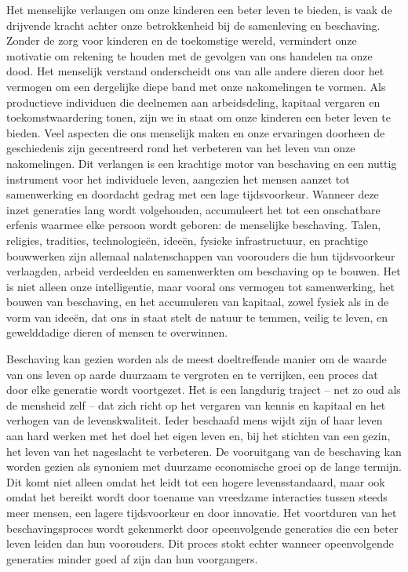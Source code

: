 \documentclass[
  a5paper,
  smalldemyvopaper,11pt,twoside,onecolumn,openright,extrafontsizes,
hidelinks]{memoir}
\begin{document}
Het menselijke verlangen om onze kinderen een beter leven te bieden, is
vaak de drijvende kracht achter onze betrokkenheid bij de samenleving en
beschaving. Zonder de zorg voor kinderen en de toekomstige wereld,
vermindert onze motivatie om rekening te houden met de gevolgen van ons
handelen na onze dood. Het menselijk verstand onderscheidt ons van alle
andere dieren door het vermogen om een dergelijke diepe band met onze
nakomelingen te vormen. Als productieve individuen die deelnemen aan
arbeidsdeling, kapitaal vergaren en toekomstwaardering tonen, zijn we in
staat om onze kinderen een beter leven te bieden. Veel aspecten die ons
menselijk maken en onze ervaringen doorheen de geschiedenis zijn
gecentreerd rond het verbeteren van het leven van onze nakomelingen. Dit
verlangen is een krachtige motor van beschaving en een nuttig instrument
voor het individuele leven, aangezien het mensen aanzet tot samenwerking
en doordacht gedrag met een lage tijdsvoorkeur. Wanneer deze inzet
generaties lang wordt volgehouden, accumuleert het tot een onschatbare
erfenis waarmee elke persoon wordt geboren: de menselijke beschaving.
Talen, religies, tradities, technologieën, ideeën, fysieke
infrastructuur, en prachtige bouwwerken zijn allemaal nalatenschappen
van voorouders die hun tijdsvoorkeur verlaagden, arbeid verdeelden en
samenwerkten om beschaving op te bouwen. Het is niet alleen onze
intelligentie, maar vooral ons vermogen tot samenwerking, het bouwen van
beschaving, en het accumuleren van kapitaal, zowel fysiek als in de vorm
van ideeën, dat ons in staat stelt de natuur te temmen, veilig te leven,
en gewelddadige dieren of mensen te overwinnen.

Beschaving kan gezien worden als de meest doeltreffende manier om de
waarde van ons leven op aarde duurzaam te vergroten en te verrijken, een
proces dat door elke generatie wordt voortgezet. Het is een langdurig
traject -- net zo oud als de mensheid zelf -- dat zich richt op het
vergaren van kennis en kapitaal en het verhogen van de levenskwaliteit.
Ieder beschaafd mens wijdt zijn of haar leven aan hard werken met het
doel het eigen leven en, bij het stichten van een gezin, het leven van
het nageslacht te verbeteren. De vooruitgang van de beschaving kan
worden gezien als synoniem met duurzame economische groei op de lange
termijn. Dit komt niet alleen omdat het leidt tot een hogere
levensstandaard, maar ook omdat het bereikt wordt door toename van
vreedzame interacties tussen steeds meer mensen, een lagere
tijdsvoorkeur en door innovatie. Het voortduren van het
beschavingsproces wordt gekenmerkt door opeenvolgende generaties die een
beter leven leiden dan hun voorouders. Dit proces stokt echter wanneer
opeenvolgende generaties minder goed af zijn dan hun voorgangers.
\end{document}
